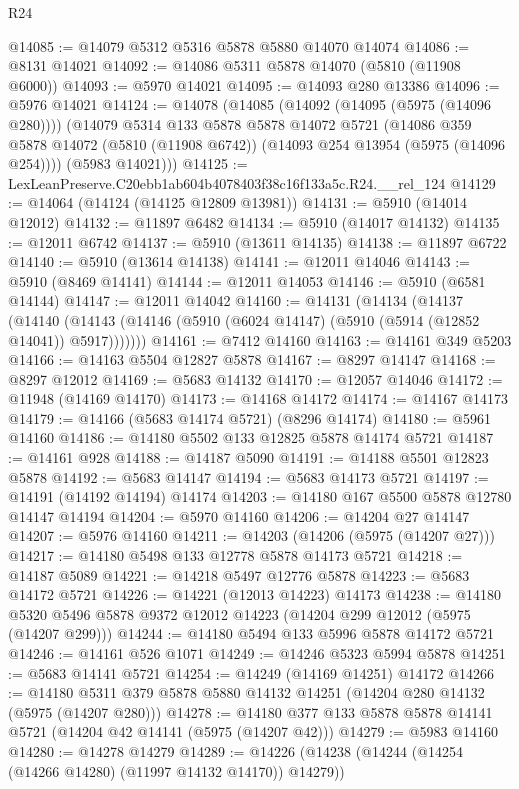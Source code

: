 \begin{lexlean}{R24}
\begin{coremodule}
@14085 := @14079 @5312 @5316 @5878 @5880 @14070 @14074
@14086 := @8131 @14021
@14092 := @14086 @5311 @5878 @14070 (@5810 (@11908 @6000))
@14093 := @5970 @14021
@14095 := @14093 @280 @13386
@14096 := @5976 @14021
@14124 := @14078
    (@14085
      (@14092 (@14095 (@5975 (@14096 @280))))
      (@14079
        @5314
        @133
        @5878
        @5878
        @14072
        @5721
        (@14086 @359 @5878 @14072 (@5810 (@11908 @6742)) (@14093 @254 @13954 (@5975 (@14096 @254))))
        (@5983 @14021)))
@14125 := LexLeanPreserve.C20ebb1ab604b4078403f38c16f133a5c.R24.__rel_124
@14129 := @14064 (@14124 (@14125 @12809 @13981))
@14131 := @5910 (@14014 @12012)
@14132 := @11897 @6482
@14134 := @5910 (@14017 @14132)
@14135 := @12011 @6742
@14137 := @5910 (@13611 @14135)
@14138 := @11897 @6722
@14140 := @5910 (@13614 @14138)
@14141 := @12011 @14046
@14143 := @5910 (@8469 @14141)
@14144 := @12011 @14053
@14146 := @5910 (@6581 @14144)
@14147 := @12011 @14042
@14160 := @14131
    (@14134
      (@14137
        (@14140 (@14143 (@14146 (@5910 (@6024 @14147) (@5910 (@5914 (@12852 @14041)) @5917)))))))
@14161 := @7412 @14160
@14163 := @14161 @349 @5203
@14166 := @14163 @5504 @12827 @5878
@14167 := @8297 @14147
@14168 := @8297 @12012
@14169 := @5683 @14132
@14170 := @12057 @14046
@14172 := @11948 (@14169 @14170)
@14173 := @14168 @14172
@14174 := @14167 @14173
@14179 := @14166 (@5683 @14174 @5721) (@8296 @14174)
@14180 := @5961 @14160
@14186 := @14180 @5502 @133 @12825 @5878 @14174 @5721
@14187 := @14161 @928
@14188 := @14187 @5090
@14191 := @14188 @5501 @12823 @5878
@14192 := @5683 @14147
@14194 := @5683 @14173 @5721
@14197 := @14191 (@14192 @14194) @14174
@14203 := @14180 @167 @5500 @5878 @12780 @14147 @14194
@14204 := @5970 @14160
@14206 := @14204 @27 @14147
@14207 := @5976 @14160
@14211 := @14203 (@14206 (@5975 (@14207 @27)))
@14217 := @14180 @5498 @133 @12778 @5878 @14173 @5721
@14218 := @14187 @5089
@14221 := @14218 @5497 @12776 @5878
@14223 := @5683 @14172 @5721
@14226 := @14221 (@12013 @14223) @14173
@14238 := @14180 @5320 @5496 @5878 @9372 @12012 @14223 (@14204 @299 @12012 (@5975 (@14207 @299)))
@14244 := @14180 @5494 @133 @5996 @5878 @14172 @5721
@14246 := @14161 @526 @1071
@14249 := @14246 @5323 @5994 @5878
@14251 := @5683 @14141 @5721
@14254 := @14249 (@14169 @14251) @14172
@14266 := @14180 @5311 @379 @5878 @5880 @14132 @14251 (@14204 @280 @14132 (@5975 (@14207 @280)))
@14278 := @14180 @377 @133 @5878 @5878 @14141 @5721 (@14204 @42 @14141 (@5975 (@14207 @42)))
@14279 := @5983 @14160
@14280 := @14278 @14279
@14289 := @14226 (@14238 (@14244 (@14254 (@14266 @14280) (@11997 @14132 @14170)) @14279))

\end{coremodule}
\end{lexlean}
